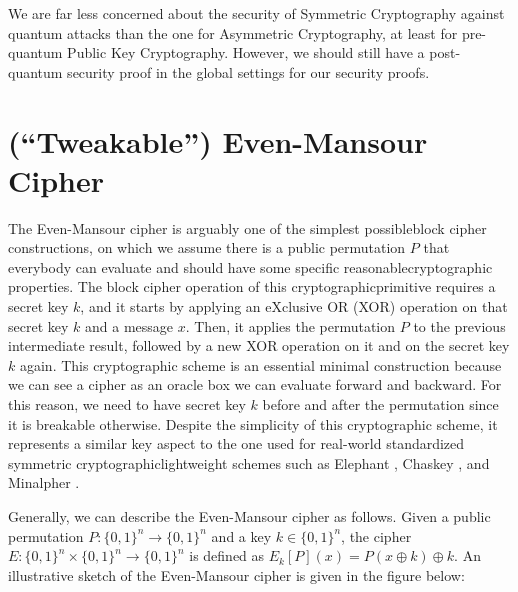 \documentclass[12pt]{article}
\begin{document}
    We are far less concerned about the security of Symmetric Cryptography against quantum attacks than the one for Asymmetric Cryptography, at least for pre-quantum Public Key Cryptography. However, we should still have a post-quantum security proof in the global settings for our security proofs.

    
    \section{(``Tweakable'') Even-Mansour Cipher}
    \label{sec:tweakable-even-mansour-cipher}

    The Even-Mansour cipher \cite{even-mansour:construction-cipher-single-pseudorandom-permutation:1997:03-2024,dunkelman-keller-shamir:minimalism-cryptography-even-mansour-scheme-revisited:2012:03-2024} is arguably one of the simplest possible\break block cipher constructions, on which we assume there is a public permutation $P$ that everybody can evaluate and should have some specific reasonable\break cryptographic properties. The block cipher operation of this cryptographic\break primitive requires a secret key $k$, and it starts by applying an eXclusive OR (XOR) operation on that secret key $k$ and a message $x$. Then, it applies the permutation $P$ to the previous intermediate result, followed by a new XOR operation on it and on the secret key $k$ again. This cryptographic scheme is an essential minimal construction because we can see a cipher as an oracle box we can evaluate forward and backward. For this reason, we need to have secret key $k$ before and after the permutation since it is breakable otherwise. Despite the simplicity of this cryptographic scheme, it represents a similar key aspect to the one used for real-world standardized symmetric cryptographic\break lightweight schemes such as Elephant \cite{beyne-chen-dobraunig-mennink:dumbo-jumbo-delirium-parallel-authenticated-encryption-lightweight-circus:2020:03-2024}, Chaskey \cite{mouha-et-al:chaskey-efficient-mac-algorithm-32-bit-microcontrollers:2014:03-2024}, and Minalpher \cite{sasaki-et-al:minalpher-v1:2014:03-2024}.

    \noindent Generally, we can describe the Even-Mansour cipher as follows. Given a public permutation $P: {\{0, 1 \}}^{n} \rightarrow {\{0, 1 \}}^{n}$ and a key $k \in {\{0, 1 \}}^{n}$, the cipher $E: {\{0, 1 \}}^{n} \times {\{0, 1 \}}^{n} \rightarrow {\{0, 1 \}}^{n}$ is defined as ${E}_{k} [P](x) = P(x \oplus k) \oplus k$. An illustrative sketch of the Even-Mansour cipher is given in the figure below:
\end{document}
